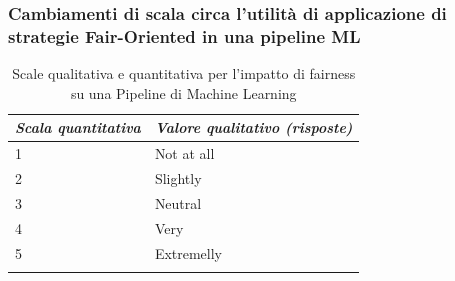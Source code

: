     
    
    \subsubsection{Cambiamenti di scala circa l'utilità di applicazione di strategie Fair-Oriented in una pipeline ML}
    
    \begin{center}
		\hspace*{-5mm}%
	\end{center}
	
     \begin{longtable}{| p{} | p{} |} 
      
      \hline\textbf{\textit{Scala quantitativa}} & \textbf{\textit{Valore qualitativo (risposte)}}
       
        
        \\ \hline
        \rowcolor{Gray}
        1    
        
        &  Not at all

        \\ \hline


        2    
        
        & Slightly


        \\ \hline
        \rowcolor{Gray}
        3   
        
        &  Neutral

        \\ \hline


        4   
        
        & Very


        \\ \hline
        
        \rowcolor{Gray}
        5
        
        &  Extremelly


        \\ \hline
        \caption{Scale qualitativa e quantitativa per l'impatto di fairness su una Pipeline di Machine Learning} %
        \label{tab:myfirstlongtable}
    \end{longtable}
    

